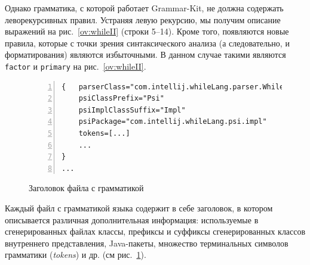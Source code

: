 \noindent
Однако грамматика, с которой работает Grammar-Kit, не должна содержать леворекурсивных правил.
Устраняя левую рекурсию, мы получим описание выражений на рис.~\ref{ov:whileII} (строки 5--14).
Кроме того, появляются новые правила, которые с точки зрения синтаксического анализа (а следовательно, и форматирования) являются избыточными.
В данном случае такими являются \lstinline{factor} и \lstinline{primary} на рис.~\ref{ov:whileII}.
\begin{figure}[b]
    \begin{lstlisting}[numbers=left, numbersep=3pt, basicstyle=\ttfamily\small, numberstyle=\tiny, frame=bottom, language={}]
{   parserClass="com.intellij.whileLang.parser.WhileParser"
    psiClassPrefix="Psi"
    psiImplClassSuffix="Impl"
    psiPackage="com.intellij.whileLang.psi.impl"
    tokens=[...]
    ...
}
...
    \end{lstlisting}
    \caption{Заголовок файла с грамматикой}
    \label{ov:whileIII}
\end{figure}
Каждый файл с грамматикой языка содержит в себе заголовок, в котором описывается различная дополнительная информация: используемые в сгенерированных файлах классы, префиксы и суффиксы сгенерированных классов внутреннего представления, Java-пакеты, множество терминальных символов грамматики (\emph{tokens}) и др. (см рис.~\ref{ov:whileIII}).




